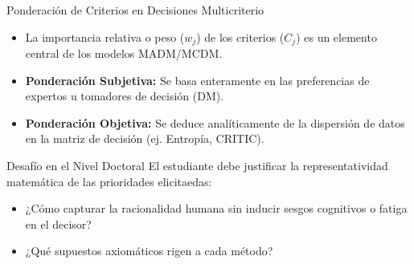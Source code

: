 \documentclass[aspectratio=169, 10pt]{beamer}
\begin{document}
\begin{frame}{Ponderación de Criterios en Decisiones Multicriterio}
    \begin{itemize}
        \item La importancia relativa o peso ($w_j$) de los criterios ($C_j$) es un elemento central de los modelos MADM/MCDM.
        \item \textbf{Ponderación Subjetiva:} Se basa enteramente en las preferencias de expertos u tomadores de decisión (DM).
        \item \textbf{Ponderación Objetiva:} Se deduce analíticamente de la dispersión de datos en la matriz de decisión (ej. Entropía, CRITIC).
    \end{itemize}
    \begin{block}{Desafío en el Nivel Doctoral}
        El estudiante debe justificar la representatividad matemática de las prioridades elicitaedas:
        \begin{itemize}
            \item ¿Cómo capturar la racionalidad humana sin inducir sesgos cognitivos o fatiga en el decisor?
            \item ¿Qué supuestos axiomáticos rigen a cada método?
        \end{itemize}
    \end{block}
\end{frame}
\end{document}
